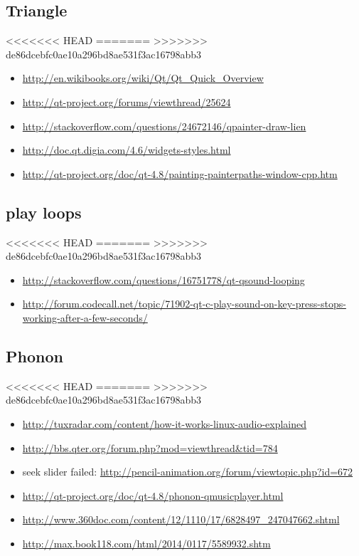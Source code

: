\documentclass[9pt,b5paper]{article}
\begin{document}
\subsection{Triangle}
<<<<<<< HEAD
\label{sec-18-19}
=======
\label{sec-17-19}
>>>>>>> de86dcebfc0ae10a296bd8ae531f3ac16798abb3
\begin{itemize}
\item \url{http://en.wikibooks.org/wiki/Qt/Qt_Quick_Overview}
\item \url{http://qt-project.org/forums/viewthread/25624}
\item \url{http://stackoverflow.com/questions/24672146/qpainter-draw-lien}
\item \url{http://doc.qt.digia.com/4.6/widgets-styles.html}
\item \url{http://qt-project.org/doc/qt-4.8/painting-painterpaths-window-cpp.htm}
\end{itemize}
\subsection{play loops}
<<<<<<< HEAD
\label{sec-18-20}
=======
\label{sec-17-20}
>>>>>>> de86dcebfc0ae10a296bd8ae531f3ac16798abb3
\begin{itemize}
\item \url{http://stackoverflow.com/questions/16751778/qt-qsound-looping}
\item \url{http://forum.codecall.net/topic/71902-qt-c-play-sound-on-key-press-stops-working-after-a-few-seconds/}
\end{itemize}
\subsection{Phonon}
<<<<<<< HEAD
\label{sec-18-21}
=======
\label{sec-17-21}
>>>>>>> de86dcebfc0ae10a296bd8ae531f3ac16798abb3
\begin{itemize}
\item \url{http://tuxradar.com/content/how-it-works-linux-audio-explained}
\item \url{http://bbs.qter.org/forum.php?mod=viewthread&tid=784}
\item seek slider failed: \url{http://pencil-animation.org/forum/viewtopic.php?id=672}
\item \url{http://qt-project.org/doc/qt-4.8/phonon-qmusicplayer.html}
\item \url{http://www.360doc.com/content/12/1110/17/6828497_247047662.shtml}
\item \url{http://max.book118.com/html/2014/0117/5589932.shtm}
\end{itemize}
\end{document}
